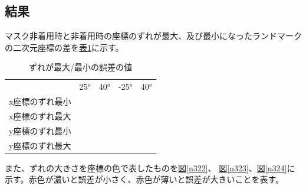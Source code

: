 \documentclass[]{jarticle}          %
\begin{document}
\subsection{結果}
マスク非着用時と非着用時の座標のずれが最大、及び最小になったランドマークの二次元座標の差を\hyperref[n321]{表\ref{n321}}に示す。

\begin{table}[ht!]
  \begin{center}
    \begin{tabular}{lrrrr}
      & 25° & 40° & -25° & 40° \\
      x座標のずれ最小 &  &  &  &  \\
      x座標のずれ最大 &  &  &  &  \\
      y座標のずれ最小 &  &  &  &  \\
      y座標のずれ最大 &  &  &  & 
    \end{tabular}
    \caption{ずれが最大/最小の誤差の値}
    \label{n321}
  \end{center}
\end{table}



また、ずれの大きさを座標の色で表したものを\hyperref[n322]{図\ref{n322}}、
\hyperref[n323]{図\ref{n323}}、\hyperref[n324]{図\ref{n324}}に示す。赤色が濃いと誤差が小さく、赤色が薄いと誤差が大きいことを表す。
\end{document}
